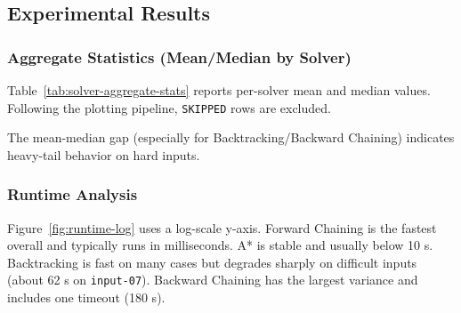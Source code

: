 \subsection{Experimental Results}

\subsubsection{Aggregate Statistics (Mean/Median by Solver)}
Table~\ref{tab:solver-aggregate-stats} reports per-solver mean and median values. Following the plotting pipeline, \texttt{SKIPPED} rows are excluded.

\begin{table}[H]
\centering
\caption{Aggregate performance statistics by solver (excluding \texttt{SKIPPED} rows).}
\label{tab:solver-aggregate-stats}
\scriptsize
\setlength{\tabcolsep}{4pt}
\end{table}

The mean-median gap (especially for Backtracking/Backward Chaining) indicates heavy-tail behavior on hard inputs.

\subsubsection{Runtime Analysis}
Figure~\ref{fig:runtime-log} uses a log-scale y-axis. Forward Chaining is the fastest overall and typically runs in milliseconds. A* is stable and usually below 10 s. Backtracking is fast on many cases but degrades sharply on difficult inputs (about 62 s on \texttt{input-07}). Backward Chaining has the largest variance and includes one timeout (180 s).

